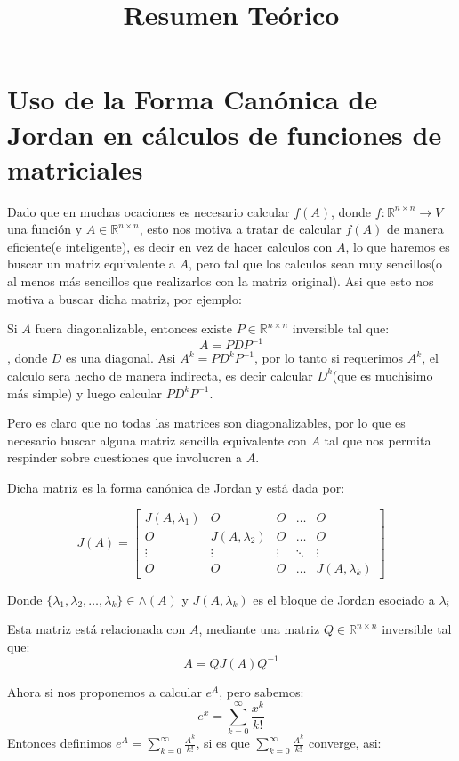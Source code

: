 \documentclass[10pt,a4paper]{article}
\title{Resumen Teórico}
\begin{document}
\section{Uso de la Forma Canónica de Jordan en cálculos de funciones de matriciales}

Dado que en muchas ocaciones es necesario calcular $f(A)$, donde $f:\mathbb{R}^{n\times n}\rightarrow V$ una función y $A\in\mathbb{R}^{n\times n}$, esto nos motiva a tratar de calcular $f(A)$ de manera eficiente(e inteligente), es decir en vez de hacer calculos con $A$, lo que haremos es buscar un matriz equivalente a $A$, pero tal que los calculos sean muy sencillos(o al menos más sencillos que realizarlos con la matriz original). Asi que esto nos motiva a buscar dicha matriz, por ejemplo:

Si $A$ fuera diagonalizable, entonces existe $P\in\mathbb{R}^{n\times n}$ inversible tal que:
$$A = PDP^{-1}$$,
donde $D$ es una diagonal. Asi $A^{k} = PD^{k}P^{-1}$, por lo tanto si requerimos $A^{k}$, el calculo sera hecho de manera indirecta, es decir calcular $D^{k}$(que es muchisimo más simple) y luego calcular $PD^{k}P^{-1}$.

Pero es claro que no todas las matrices son diagonalizables, por lo que es necesario buscar alguna matriz sencilla equivalente con $A$ tal que nos permita respinder sobre cuestiones que involucren a $A$.

Dicha matriz es la forma canónica de Jordan y está dada  por:

$$J(A) = \begin{bmatrix}
J(A,\lambda_{1})	&	O	&	O	&	\ldots	&	O\\
O	&	J(A,\lambda_{2})	&	O	&	\ldots	&	O\\
\vdots	&	\vdots	&	\vdots	&	\ddots	&	\vdots\\
O	&	O	&	O	&	\ldots	&	J(A, \lambda_{k})
\end{bmatrix}$$ 

Donde $\{\lambda_{1},\lambda_{2},\ldots ,\lambda_{k}\}\in \wedge (A)$ y $J(A,\lambda_{k})$ es el bloque de Jordan esociado a $\lambda_{i}$

Esta matriz está relacionada con $A$, mediante una matriz $Q\in\mathbb{R}^{n\times n}$ inversible tal que:
$$A = QJ(A)Q^{-1}$$

Ahora si nos proponemos a calcular $e^{A}$, pero sabemos:
$$e^{x} = \sum_{k=0}^{\infty}\frac{x^{k}}{k!}$$
Entonces definimos $e^{A} = \sum_{k=0}^{\infty}\frac{A^{k}}{k!}$, si es que $\sum_{k=0}^{\infty}\frac{A^{k}}{k!}$ converge, asi:
\end{document}
